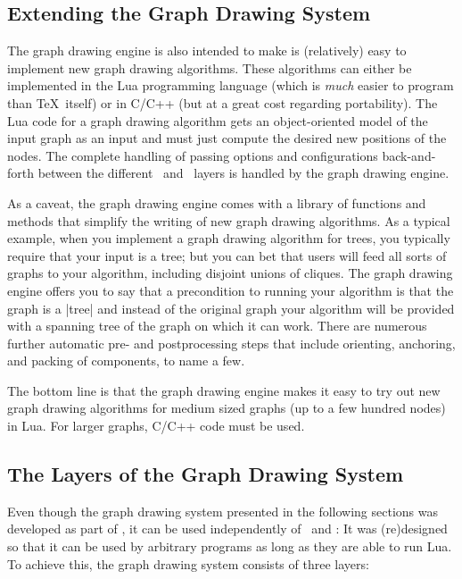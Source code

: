 \subsection{Extending the Graph Drawing System}

The graph drawing engine is also intended to make is
(relatively) easy to implement new graph drawing algorithms. These
algorithms can either be implemented in the Lua programming
language (which is \emph{much} easier to program than \TeX\
itself) or in C/C++ (but at a great cost regarding portability). The
Lua code for a graph drawing algorithm gets an 
object-oriented model of the input graph as an input and must just
compute the desired new positions of the nodes. The complete
handling of passing options and configurations back-and-forth
between the different \tikzname\ and \pgfname\ layers is handled by
the graph drawing engine. 

As a caveat, the graph drawing engine comes with a library of
functions and methods that simplify the writing of new
graph drawing algorithms. As a typical example, when you implement a 
graph drawing algorithm for trees, you typically require that your
input is a tree; but you can bet that users will feed all sorts of
graphs to your algorithm, including disjoint unions of cliques. The
graph drawing engine offers you to say that a precondition to running
your algorithm is that the graph is a |tree| and instead of the original graph your
algorithm will be provided with a spanning tree of the graph on
which it can work. There are numerous further automatic pre- and
postprocessing steps that include orienting, anchoring, and packing
of components, to name a few.

The bottom line is that the graph drawing engine makes it easy
to try out new graph drawing algorithms for medium sized graphs (up
to a few hundred nodes) in Lua. For larger graphs, C/C++ code must be
used.



\subsection{The Layers of the Graph Drawing System}

\label{section-gd-layers}

Even though the graph drawing system presented in the following
sections was developed as part of \pgfname, it can be used
independently of \pgfname\ and \tikzname: It was (re)designed so that
it can be used by arbitrary programs as long as they are able to run
Lua. To achieve this, the graph drawing system consists of three
layers:

